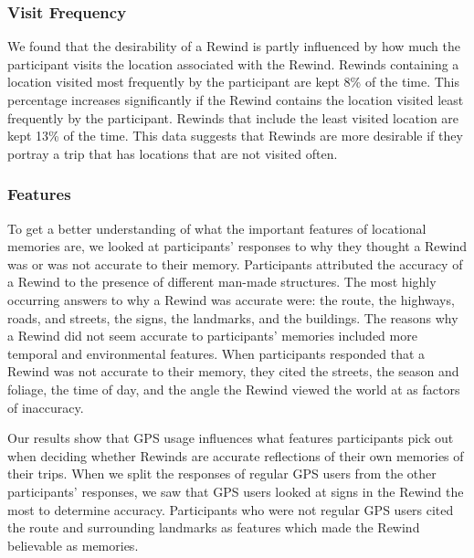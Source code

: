 \documentclass{sigchi}
\begin{document}
\subsubsection{Visit Frequency}
We found that the desirability of a Rewind is partly influenced by how much the participant visits the location associated with the Rewind. Rewinds containing a location visited most frequently by the participant are kept 8\% of the time. This percentage increases significantly if the Rewind contains the location visited least frequently by the participant. Rewinds that include the least visited location are kept 13\% of the time. This data suggests that Rewinds are more desirable if they portray a trip that has locations that are not visited often.


\subsubsection{Features}
To get a better understanding of what the important features of locational memories are, we looked at participants' responses to why they thought a Rewind was or was not accurate to their memory. Participants attributed the accuracy of a Rewind to the presence of different man-made structures. The most highly occurring answers to why a Rewind was accurate were: the route, the highways, roads, and streets, the signs, the landmarks, and the buildings. The reasons why a Rewind did not seem accurate to participants' memories included more temporal and environmental features. When participants responded that a Rewind was not accurate to their memory, they cited the streets, the season and foliage, the time of day, and the angle the Rewind viewed the world at as factors of inaccuracy.

Our results show that GPS usage influences what features participants pick out when deciding whether Rewinds are accurate reflections of their own memories of their trips. When we split the responses of regular GPS users from the other participants' responses, we saw that GPS users looked at signs in the Rewind the most to determine accuracy. Participants who were not regular GPS users cited the route and surrounding landmarks as features which made the Rewind believable as memories.
\end{document}
